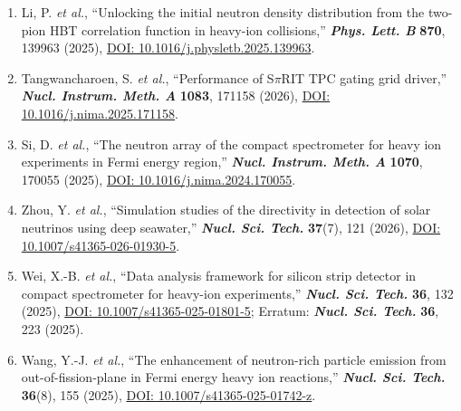 \documentclass[11pt]{article}
\begin{document}
\begin{enumerate}[leftmargin=1.7em,itemsep=0.78em,topsep=0pt]
  \item Li, P. \textit{et al.}, ``Unlocking the initial neutron density distribution from the two-pion HBT correlation function in heavy-ion collisions,'' \textbf{\textit{Phys. Lett. B}} \textbf{870}, 139963 (2025), \href{https://doi.org/10.1016/j.physletb.2025.139963}{DOI: 10.1016/j.physletb.2025.139963}.

  \item Tangwancharoen, S. \textit{et al.}, ``Performance of S$\pi$RIT TPC gating grid driver,'' \textbf{\textit{Nucl. Instrum. Meth. A}} \textbf{1083}, 171158 (2026), \href{https://doi.org/10.1016/j.nima.2025.171158}{DOI: 10.1016/j.nima.2025.171158}.

  \item Si, D. \textit{et al.}, ``The neutron array of the compact spectrometer for heavy ion experiments in Fermi energy region,'' \textbf{\textit{Nucl. Instrum. Meth. A}} \textbf{1070}, 170055 (2025), \href{https://doi.org/10.1016/j.nima.2024.170055}{DOI: 10.1016/j.nima.2024.170055}.

  \item Zhou, Y. \textit{et al.}, ``Simulation studies of the directivity in detection of solar neutrinos using deep seawater,'' \textbf{\textit{Nucl. Sci. Tech.}} \textbf{37}(7), 121 (2026), \href{https://doi.org/10.1007/s41365-026-01930-5}{DOI: 10.1007/s41365-026-01930-5}.

  \item Wei, X.-B. \textit{et al.}, ``Data analysis framework for silicon strip detector in compact spectrometer for heavy-ion experiments,'' \textbf{\textit{Nucl. Sci. Tech.}} \textbf{36}, 132 (2025), \href{https://doi.org/10.1007/s41365-025-01801-5}{DOI: 10.1007/s41365-025-01801-5}; Erratum: \textbf{\textit{Nucl. Sci. Tech.}} \textbf{36}, 223 (2025).

  \item Wang, Y.-J. \textit{et al.}, ``The enhancement of neutron-rich particle emission from out-of-fission-plane in Fermi energy heavy ion reactions,'' \textbf{\textit{Nucl. Sci. Tech.}} \textbf{36}(8), 155 (2025), \href{https://doi.org/10.1007/s41365-025-01742-z}{DOI: 10.1007/s41365-025-01742-z}.
\end{enumerate}
\end{document}
